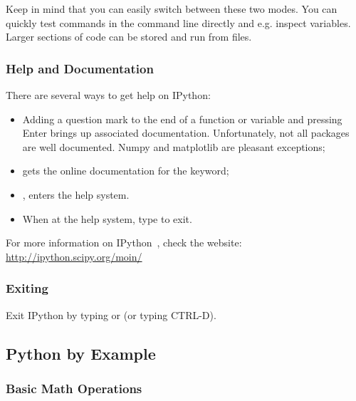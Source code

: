 


Keep in mind that you can easily switch between these two modes. You can
quickly test commands in the command line directly and e.g. inspect variables.
Larger sections of code can be stored and run from files.

\subsubsection{Help and Documentation}

There are several ways to get help on IPython:

\begin{itemize}
\item Adding a question mark to the end of a function or variable and pressing Enter brings up associated documentation. Unfortunately, not all packages are well documented. Numpy and matplotlib are pleasant exceptions;
\item {} gets the online documentation for the  keyword;
\item {}, enters the help system.
\item When at the help system, type  to exit.
\end{itemize}

\noindent For more information on IPython~\citep{PER-GRA:2007}, check the website: \url{http://ipython.scipy.org/moin/}

\subsubsection{Exiting}

Exit IPython by typing  or  (or typing CTRL-D).

\subsection{Python by Example}

\subsubsection{Basic Math Operations}

